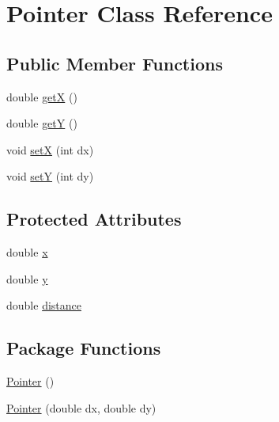 \hypertarget{class_pointer}{
\section{Pointer Class Reference}
\label{class_pointer}
}
\subsection*{Public Member Functions}
\begin{DoxyCompactItemize}
\item 
double \hyperlink{class_pointer_a610867adb5adc06157f9ebee2a90ac60}{getX} ()
\item 
double \hyperlink{class_pointer_a082805b6b148c468b8cef2c15094398a}{getY} ()
\item 
void \hyperlink{class_pointer_a40c091901566357375b9b94a05245141}{setX} (int dx)
\item 
void \hyperlink{class_pointer_a0b61543ab67343ae138815e8aade60bb}{setY} (int dy)
\end{DoxyCompactItemize}
\subsection*{Protected Attributes}
\begin{DoxyCompactItemize}
\item 
double \hyperlink{class_pointer_a3355e2637f3fcf81237185750b93fb63}{x}
\item 
double \hyperlink{class_pointer_ad40ec5fcc04894ee9e3b25d7059bf9db}{y}
\item 
double \hyperlink{class_pointer_a0cbed6a53ba239e3f499ed749ecef4f8}{distance}
\end{DoxyCompactItemize}
\subsection*{Package Functions}
\begin{DoxyCompactItemize}
\item 
\hyperlink{class_pointer_aadf646a5cab980f8310779ae6d885625}{Pointer} ()
\item 
\hyperlink{class_pointer_ae361b8002842976e07c6579b615e34f2}{Pointer} (double dx, double dy)
\end{DoxyCompactItemize}


